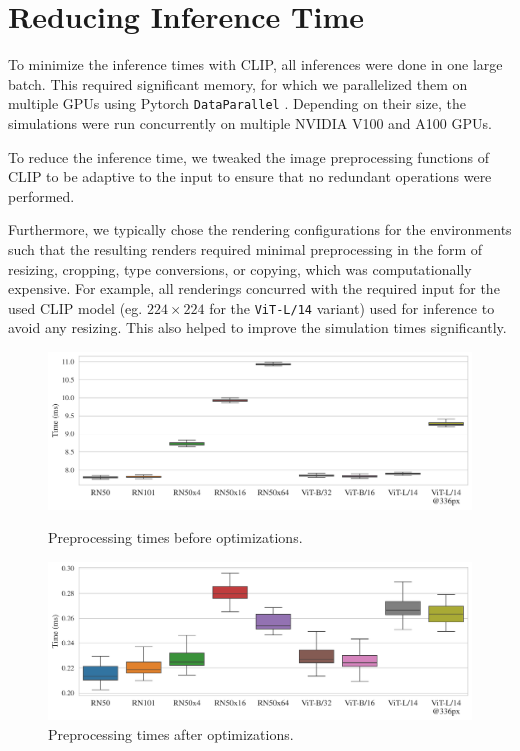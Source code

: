 \section{Reducing Inference Time}
\label{sec:improving-infer}
To minimize the inference times with CLIP, all inferences were done in one large batch.
This required significant memory, for which we parallelized them on multiple GPUs using Pytorch \texttt{DataParallel} \citep{pytorch}.
Depending on their size, the simulations were run concurrently on multiple NVIDIA V100 and A100 GPUs.

To reduce the inference time, we tweaked the image preprocessing functions of CLIP to be adaptive to the input to ensure that no redundant operations were performed.

Furthermore, we typically chose the rendering configurations for the environments such that the resulting renders required minimal preprocessing in the form of resizing, cropping, type conversions, or copying, which was computationally expensive.
For example, all renderings concurred with the required input for the used CLIP model (eg. \(224 \times 224\) for the \texttt{ViT-L/14} variant) used for inference to avoid any resizing.
This also helped to improve the simulation times significantly.\\

\begin{figure}[H]
    \centering
    \includegraphics[width=\textwidth]{images/full_transform.pdf}\vspace{-15pt}
    \caption{Preprocessing times before optimizations.}\vspace{15pt}
    \includegraphics[width=\textwidth]{images/fast_transform.pdf}\vspace{-15pt}
    \caption{Preprocessing times after optimizations.}
    \label{fig:preprocessing-time-improvement}
\end{figure}


